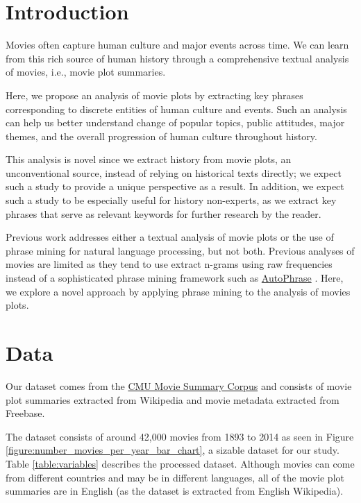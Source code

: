 \documentclass[hidelinks]{article}
\begin{document}
\begin{multicols}{2}
\section{Introduction} %
Movies often capture human culture and major events across time. We can learn from this rich source of human history through a comprehensive textual analysis of movies, i.e., movie plot summaries.

Here, we propose an analysis of movie plots by extracting key phrases corresponding to discrete entities of human culture and events. Such an analysis can help us better understand change of popular topics, public attitudes, major themes, and the overall progression of human culture throughout history.

This analysis is novel since we extract history from movie plots, an unconventional source, instead of relying on historical texts directly; we expect such a study to provide a unique perspective as a result. In addition, we expect such a study to be especially useful for history non-experts, as we extract key phrases that serve as relevant keywords for further research by the reader.

Previous work addresses either a textual analysis of movie plots or the use of phrase mining for natural language processing, but not both. Previous analyses of movies are limited as they tend to use extract n-grams using raw frequencies instead of a sophisticated phrase mining framework such as \href{https://github.com/shangjingbo1226/AutoPhrase}{AutoPhrase} \cite{DBLP:journals/corr/ShangLJRVH17}. Here, we explore a novel approach by applying phrase mining to the analysis of movies plots.

\section{Data}
Our dataset comes from the \href{http://www.cs.cmu.edu/~ark/personas/}{CMU Movie Summary Corpus} \cite{Bamman2013LearningLP} and consists of movie plot summaries extracted from Wikipedia and movie metadata extracted from Freebase.

The dataset consists of around 42,000 movies from 1893 to 2014 as seen in Figure \ref{figure:number_movies_per_year_bar_chart}, a sizable dataset for our study. Table \ref{table:variables} describes the processed dataset. Although movies can come from different countries and may be in different languages, all of the movie plot summaries are in English (as the dataset is extracted from English Wikipedia).


\end{multicols}
\end{document}
